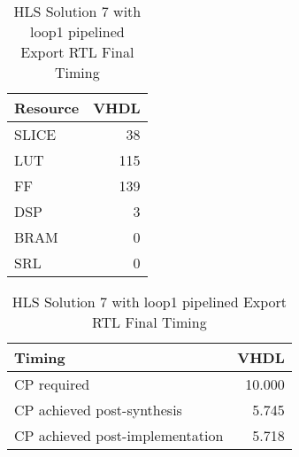 \begin{table}[H]
	\centering
	\begin{minipage}[t]{0.45\linewidth}
		\centering
		\begin{tabular}{|l|r|}
			\hline
			\textbf{Resource} & \textbf{VHDL} \\
			\hline
			SLICE & 38 \\
			\hline
			LUT & 115 \\
			\hline
			FF & 139 \\
			\hline
			DSP & 3 \\
			\hline
			BRAM & 0 \\
			\hline
			SRL & 0 \\
			\hline
		\end{tabular}
		\caption{HLS Solution 7 with loop1 pipelined Export RTL Resource Usage}
		\label{tab:hls-solution-7-loop1-pipeline-export-rtl-resoruce-usage}
	\end{minipage}
	\hfill
	\begin{minipage}[t]{0.45\linewidth}
		\centering
		\begin{tabular}{|l|r|}
			\hline
			\textbf{Timing} & \textbf{VHDL} \\
			\hline
			CP required & 10.000 \\
			\hline
			CP achieved post-synthesis & 5.745 \\
			\hline
			CP achieved post-implementation & 5.718 \\
			\hline
		\end{tabular}
		\caption{HLS Solution 7 with loop1 pipelined Export RTL Final Timing}
		\label{tab:hls-solution-7-loop1-pipeline-export-rtl-final-timing}
	\end{minipage}
\end{table}